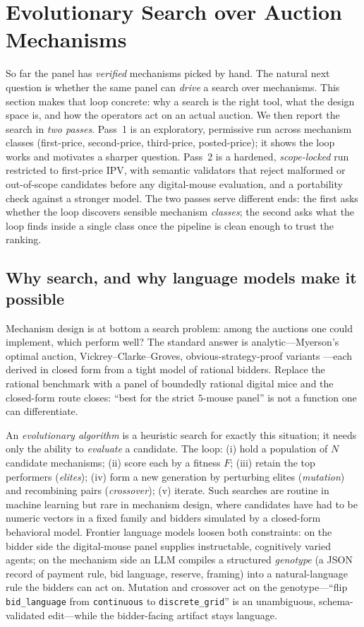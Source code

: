 \documentclass[12pt]{article}
\begin{document}
\section{Evolutionary Search over Auction Mechanisms}
\label{sec:ea}

So far the panel has \emph{verified} mechanisms picked by hand. The natural next
question is whether the same panel can \emph{drive} a search over mechanisms. This
section makes that loop concrete: why a search is the right tool, what the design
space is, and how the operators act on an actual auction. We then report the search
in \emph{two passes}. Pass~1 is an exploratory, permissive run across mechanism
classes (first-price, second-price, third-price, posted-price); it shows the loop
works and motivates a sharper question. Pass~2 is a hardened, \emph{scope-locked}
run restricted to first-price IPV, with semantic validators that reject malformed or
out-of-scope candidates before any digital-mouse evaluation, and a portability check
against a stronger model. The two passes serve different ends: the first asks
whether the loop discovers sensible mechanism \emph{classes}; the second asks what
the loop finds inside a single class once the pipeline is clean enough to trust the
ranking.

\subsection{Why search, and why language models make it possible}

Mechanism design is at bottom a search problem: among the auctions one could
implement, which perform well? The standard answer is analytic---Myerson's optimal
auction, Vickrey--Clarke--Groves, obvious-strategy-proof variants
\citep{li2017,vickrey1961}---each derived in closed form from a tight model of
rational bidders. Replace the rational benchmark with a panel of boundedly rational
digital mice and the closed-form route closes: ``best for the strict $5$-mouse
panel'' is not a function one can differentiate.

An \emph{evolutionary algorithm} is a heuristic search for exactly this situation;
it needs only the ability to \emph{evaluate} a candidate. The loop: (i) hold a
population of $N$ candidate mechanisms; (ii) score each by a fitness $F$; (iii)
retain the top performers (\emph{elites}); (iv) form a new generation by perturbing
elites (\emph{mutation}) and recombining pairs (\emph{crossover}); (v) iterate.
Such searches are routine in machine learning but rare in mechanism design, where
candidates have had to be numeric vectors in a fixed family and bidders simulated
by a closed-form behavioral model. Frontier language models loosen both
constraints: on the bidder side the digital-mouse panel supplies instructable,
cognitively varied agents; on the mechanism side an LLM compiles a structured
\emph{genotype} (a JSON record of payment rule, bid language, reserve, framing)
into a natural-language rule the bidders can act on. Mutation and crossover act on
the genotype---``flip \texttt{bid\_language} from \texttt{continuous} to
\texttt{discrete\_grid}'' is an unambiguous, schema-validated edit---while the
bidder-facing artifact stays language.
\end{document}
